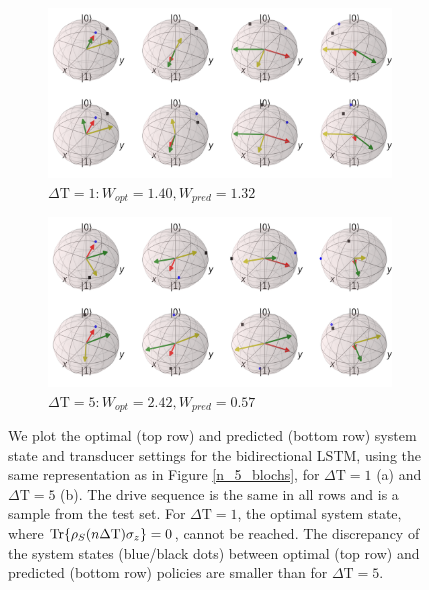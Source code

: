 \newpage

\begin{figure}[H]
	\centering
	\begin{subfigure}{0.85\textwidth}
		\centering
		\includegraphics[width=\textwidth]{img/bloch_comp_1_crop_sphere2}
		\caption{$\Delta \mathrm{T} = 1: W_{opt} = 1.40, W_{pred} = 1.32$}
		\label{}
	\end{subfigure}
	\begin{subfigure}{0.85\textwidth}
		\centering
		\includegraphics[width=\textwidth]{img/bloch_comp_5_crop_sphere2}
		\caption{$\Delta \mathrm{T} = 5: W_{opt} = 2.42, W_{pred} = 0.57$}
		\label{}
	\end{subfigure}
	\caption{We plot the optimal (top row) and predicted (bottom row) system state and transducer settings for the bidirectional LSTM, using the same representation as in Figure \ref{n_5_blochs}, for $\Delta \mathrm{T} = 1$ (a) and $\Delta \mathrm{T} = 5$ (b). The drive sequence is the same in all rows and is a sample from the test set. For $\Delta \mathrm{T} = 1$, the optimal system state, where $\Tr{\rho_S(n \Delta \mathrm{T}) \sigma_z} = 0$, cannot be reached. The discrepancy of the system states (blue/black dots) between optimal (top row) and predicted (bottom row) policies are smaller than for $\Delta \mathrm{T} = 5$.}
	\label{blochsdt15}
\end{figure}

